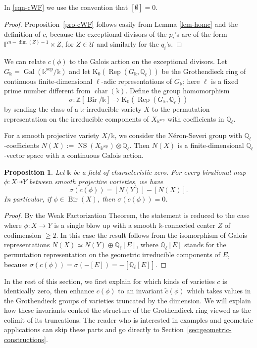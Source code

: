 \documentclass[a4paper,12pt]{amsart}
\def\k{\mathbb k}
\def\P{\mathbb P}
\def\Q{\mathbb Q}
\def\Z{\mathbb Z}
\def\chr{{\operatorname{char}}}
\def\NS{{\operatorname{NS}}}
\def\chr{{\operatorname{char}}}
\def\Bir{{\operatorname{Bir}}}
\def\Rep{{\operatorname{Rep}}}
\def\Gal{{\operatorname{Gal}}}
\def\Kt{{\mathrm{K}}}
\theoremstyle{plain}
\newtheorem{proposition}[dummy]{Proposition}
\numberwithin{equation}{section}
\theoremstyle{definition}
\newcommand{\ti}[1]{\tilde{#1}}
\newcommand{\cU}{\mathcal{U}}
\newcommand{\gs}{\sigma}
\newcommand{\sep}{\mathrm{sep}}
\renewcommand{\(}{\left(}
\renewcommand{\)}{\right)}
\newcommand{\dto}{\dashrightarrow}
\begin{document}
In \eqref{eqn-cWF} we use the convention that $[\emptyset] = 0$.

\begin{proof}

Proposition~\ref{pro-cWF} follows easily from
Lemma \ref{lem-homc} and the definition of $c$,
because the exceptional divisors of the $p_i$'s are of the form
$\P^{n-\dim(Z)-1} \times Z$, for $Z \in \cU$
and similarly for the $q_i$'s.
\end{proof}

We can relate $c(\phi)$ to the Galois action
on the exceptional
divisors.
Let $G_\k = \Gal(\k^{\sep}/\k)$
and let $\Kt_0(\Rep(G_\k,\Q_\ell))$ be the Grothendieck
ring of continuous finite-dimensional 
$\ell$-adic representations of $G_\k$; here
$\ell$ is a fixed prime number different from $\chr(\k)$. 
Define the group homomorphism
\begin{equation}\label{eq:sigma}
\gs: \Z[\Bir/\k] \to \Kt_0(\Rep(G_\k,\Q_\ell))
\end{equation}
by sending the class of a $\k$-irreducible variety 
$X$ to the permutation representation
on the irreducible components of $X_{\k^{\sep}}$
with coefficients in $\Q_\ell$.

For a smooth projective variety $X/\k$, 
we consider the N\'eron-Severi group with $\Q_\ell$-coefficients
$N(X) := \NS(X_{\k^{\sep}}) \otimes \Q_\ell$.
Then $N(X)$ is a finite-dimensional $\Q_\ell$-vector
space \cite[Theorem II.4.5]{Kollarrat} with a
continuous 
Galois action.


\begin{proposition}\label{prop:Picnb}
Let $\k$ be a field 
of characteristic zero.
For every birational map $\phi : X \dto Y$ 
between smooth projective 
varieties,
we have
$$\gs(c(\phi)) = [N(Y)] - [N(X)].$$
In particular, if $\phi \in \Bir(X)$,
then $\sigma(c(\phi)) = 0$.
\end{proposition}
\begin{proof}

By the Weak Factorization Theorem, 
the statement is reduced to the case where
$\phi: X \to Y$ is a single blow up 
with a smooth
$\k$-connected center $Z$ of codimension $\ge 2$.
In this case
the result follows
from the isomorphism of Galois representations
$N(X) \simeq N(Y) \oplus \Q_\ell[E]$,
where $\Q_\ell[E]$ stands for the permutation
representation on the geometric irreducible components
of $E$, because $\sigma(c(\phi)) = \sigma(-[E]) = -[\Q_\ell[E]]$.
\end{proof}


In the rest of this section, we 
first explain for which kinds of varieties
$c$ is identically zero,
then enhance $c(\phi)$ to 
an invariant $\ti{c}(\phi)$
which takes values in the
Grothendieck groups of varieties truncated
by the dimension.
We will explain how these invariants control the structure
of the Grothendieck ring
viewed as the 
colimit of its truncations.
The reader who is interested in examples and geometric applications
can skip these parts and go directly
to Section~\ref{sec:geometric-constructions}.
\end{document}
